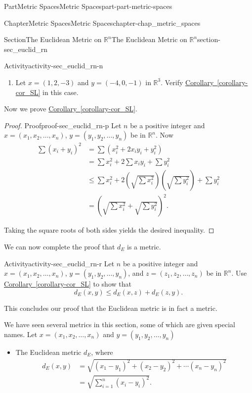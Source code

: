 \documentclass[oneside,10pt,]{book}
\newcommand{\xreffont}{\relax}
\numberwithin{equation}{chapter}
\newcommand{\R}{\mathbb{R}}
\newcommand{\amp}{&}
\begin{document}
\begin{partptx}{Part}{Metric Spaces}{}{Metric Spaces}{}{}{part-part-metric-spaces}
\begin{chapterptx}{Chapter}{Metric Spaces}{}{Metric Spaces}{}{}{chapter-chap_metric_spaces}
\begin{sectionptx}{Section}{The Euclidean Metric on \(\R^n\)}{}{The Euclidean Metric on \(\R^n\)}{}{}{section-sec_euclid_rn}
\begin{activity}{Activity}{}{activity-sec_euclid_rn-n}
\begin{enumerate}[font=\bfseries,label=(\alph*),ref=\alph*]
\item{}Let \(x=(1,2, -3)\) and \(y = (-4, 0, -1)\) in \(\R^3\). Verify \hyperref[corollary-cor_SL]{Corollary~{\xreffont\ref{corollary-cor_SL}}} in this case.%
\end{enumerate}%
\end{activity}%
Now we prove \hyperref[corollary-cor_SL]{Corollary~{\xreffont\ref{corollary-cor_SL}}}.%
\begin{proof}{Proof}{}{proof-sec_euclid_rn-p}
Let \(n\) be a positive integer and \(x = (x_1, x_2, \ldots,
x_n)\), \(y=(y_1, y_2, \ldots, y_n)\) be in \(\R^n\). Now%
\begin{align*}
\sum \left(x_i+y_i\right)^2 \amp = \sum \left(x_i^2 +2x_iy_i + y_i^2 \right)\\
\amp = \sum x_i^2 + 2\sum x_iy_i + \sum y_i^2\\
\amp \leq \sum x_i^2 + 2\left(\sqrt{\sum x_i^2}\right) \left(\sqrt{\sum y_i^2} \right) + \sum y_i^2\\
\amp = \left(\sqrt{\sum x_i^2} + \sqrt{\sum y_i^2}\right)^2\text{.}
\end{align*}
%
\par
Taking the square roots of both sides yields the desired inequality.%
\end{proof}
We can now complete the proof that \(d_E\) is a metric.%
\begin{activity}{Activity}{}{activity-sec_euclid_rn-r}%
Let \(n\) be a positive integer and \(x = (x_1, x_2, \ldots,
x_n)\), \(y=(y_1, y_2, \ldots, y_n)\), and \(z=(z_1, z_2, \ldots, z_n)\) be in \(\R^n\). Use \hyperref[corollary-cor_SL]{Corollary~{\xreffont\ref{corollary-cor_SL}}} to show that%
\begin{equation*}
d_E(x,y) \leq d_E(x,z)+d_E(z,y)\text{.}
\end{equation*}
%
\end{activity}%
This concludes our proof that the Euclidean metric is in fact a metric.%
\par
We have seen several metrics in this section, some of which are given special names. Let \(x = (x_1, x_2, \ldots,
x_n)\) and \(y = (y_1, y_2, \ldots, y_n)\)%
\begin{itemize}[label=\textbullet]
\item{}The Euclidean metric \(d_E\), where%
\begin{align*}
d_E(x,y) \amp = \sqrt{(x_1-y_1)^2 + (x_2-y_2)^2 + \cdots (x_n-y_n)^2}\\
\amp = \sqrt{\sum_{i=1}^n (x_i-y_i)^2}\text{.}
\end{align*}

\end{itemize}
\end{sectionptx}
\end{chapterptx}
\end{partptx}
\end{document}
